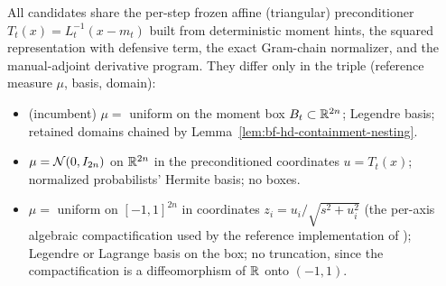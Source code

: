 \begin{definition}
\label{def:bf-hd-refdom-candidates}
All candidates share the per-step frozen affine (triangular)
preconditioner \(T_t(x)=L_t^{-1}(x-m_t)\) built from deterministic
moment hints, the squared representation with defensive term, the exact
Gram-chain normalizer, and the manual-adjoint derivative program.  They
differ only in the triple (reference measure \(\mu\), basis, domain):
\begin{itemize}[leftmargin=0.28in]
  \item[\textbf{C1}] (incumbent) \(\mu=\) uniform on the moment box
    \(B_t\subset\mathbb{R}^{2n}\); Legendre basis; retained domains chained by
    Lemma~\ref{lem:bf-hd-containment-nesting}.
  \item[\textbf{C2}] \(\mu=\mathcal{N}(0,I_{2n})\) on \(\mathbb{R}^{2n}\) in the
    preconditioned coordinates \(u=T_t(x)\); normalized probabilists'
    Hermite basis; no boxes.
  \item[\textbf{C3}] \(\mu=\) uniform on \([-1,1]^{2n}\) in coordinates
    \(z_i=u_i/\sqrt{s^2+u_i^2}\) (the per-axis algebraic
    compactification used by the reference implementation of
    \citet{zhao2024ttsequential}); Legendre or Lagrange basis on the
    box; no truncation, since the compactification is a diffeomorphism
    of \(\mathbb{R}\) onto \((-1,1)\).
\end{itemize}
\end{definition}

